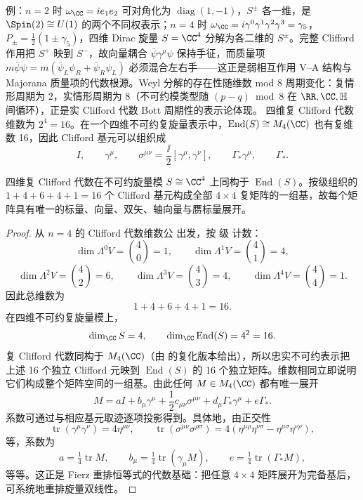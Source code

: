 例：$n=2$ 时 $\omega_\CC=i e_1e_2$ 可对角化为 $\operatorname{diag}(1,-1)$，$S^\pm$ 各一维，是 $\Spin(2)\cong U(1)$ 的两个不同权表示；$n=4$ 时 $\omega_\CC=i\gamma^0\gamma^1\gamma^2\gamma^3=\gamma_5$，$P_\pm=\frac12(1\pm\gamma_5)$，四维 Dirac 旋量 $S=\CC^4$ 分解为各二维的 $S^\pm$。完整 Clifford 作用把 $S^+$ 映到 $S^-$，故向量耦合 $\bar\psi\gamma^\mu\psi$ 保持手征，而质量项 $m\bar\psi\psi=m(\bar\psi_L\psi_R+\bar\psi_R\psi_L)$ 必须混合左右手——这正是弱相互作用 V--A 结构与 Majorana 质量项的代数根源。Weyl 分解的存在性随维数 mod 8 周期变化：复情形周期为 $2$，实情形周期为 $8$（不可约模类型随 $(p-q)\bmod8$ 在 $\RR,\CC,\mathbb H$ 间循环），正是实 Clifford 代数 Bott 周期性的表示论体现。
四维复 Clifford 代数维数为 $2^4=16$。在一个四维不可约复旋量表示中，$\operatorname{End}(S)\cong M_4(\CC)$ 也有复维数 16，因此 Clifford 基元可以组织成
\begin{equation}
I,
\qquad
\gamma^\mu,
\qquad
\sigma^{\mu\nu}=\frac{\ii}{2}[\gamma^\mu,\gamma^\nu],
\qquad
\Gamma_*\gamma^\mu,
\qquad
\Gamma_*.
\label{eq:dirac-matrix-basis}
\end{equation}

\begin{proposition}
四维复 Clifford 代数在不可约旋量模 $S\cong\CC^4$ 上同构于 $\operatorname{End}(S)$。按级组织的 $1+4+6+4+1=16$ 个 Clifford 基元构成全部 $4\times4$ 复矩阵的一组基，故每个矩阵具有唯一的标量、向量、双矢、轴向量与赝标量展开。
\end{proposition}
\begin{proof}
从 $n=4$ 的 Clifford 代数维数公 出发，按 级 计数：
\[
\dim\Lambda^0V=\binom40=1,
\qquad
\dim\Lambda^1V=\binom41=4,
\]
\[
\dim\Lambda^2V=\binom42=6,
\qquad
\dim\Lambda^3V=\binom43=4,
\qquad
\dim\Lambda^4V=\binom44=1.
\]
因此总维数为
\[
1+4+6+4+1=16.
\]
在四维不可约复旋量模上，
\[
\dim_\CC S=4,
\qquad
\dim_\CC\operatorname{End}(S)=4^2=16.
\]
复 Clifford 代数同构于 $M_4(\CC)$（由 的复化版本给出），所以忠实不可约表示把上述 16 个独立 Clifford 元映到 $\operatorname{End}(S)$ 的 16 个独立矩阵。维数相同立即说明它们构成整个矩阵空间的一组基。由此任何 $M\in M_4(\CC)$ 都有唯一展开
\[
M=aI+b_\mu\gamma^\mu
+\frac12 c_{\mu\nu}\sigma^{\mu\nu}
+d_\mu\Gamma_*\gamma^\mu+e\Gamma_*.
\]
系数可通过与相应基元取迹逐项投影得到。具体地，由正交性
\[
\operatorname{tr}(\gamma^\mu\gamma^\nu)=4\eta^{\mu\nu},\qquad
\operatorname{tr}(\sigma^{\mu\nu}\sigma^{\rho\sigma})=4(\eta^{\mu\rho}\eta^{\nu\sigma}-\eta^{\mu\sigma}\eta^{\nu\rho}),
\]
等，系数为
\[
a=\tfrac14\operatorname{tr}M,\qquad
b_\mu=\tfrac14\operatorname{tr}(\gamma_\mu M),\qquad
e=\tfrac14\operatorname{tr}(\Gamma_*M),
\]
等等。这正是 Fierz 重排恒等式的代数基础：把任意 $4\times4$ 矩阵展开为完备基后，可系统地重排旋量双线性。
\end{proof}

